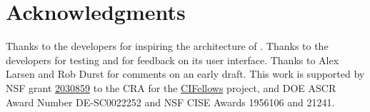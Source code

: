 \documentclass{juliacon}
\begin{document}
\section{Acknowledgments}

Thanks to the  developers for inspiring the architecture of \FT{}.
Thanks to the  developers for testing \FT{} and for feedback on its user interface.
Thanks to Alex Larsen and Rob Durst for comments on an early draft.
This work is supported by
NSF grant \href{https://nsf.gov/awardsearch/showAward?AWD_ID=2030859&HistoricalAwards=false}{2030859}
to the CRA for the \href{https://cifellows2020.org}{CIFellows} project,
and DOE ASCR Award Number DE-SC0022252 and NSF CISE Awards 1956106 and 21241.


\end{document}
